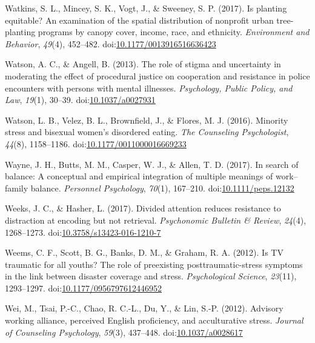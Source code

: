 \documentclass[english,man]{apa6}
\theoremstyle{definition}
\theoremstyle{definition}
\theoremstyle{definition}
\theoremstyle{remark}
\begin{document}
\hypertarget{ref-Watkins2017}{}
Watkins, S. L., Mincey, S. K., Vogt, J., \& Sweeney, S. P. (2017). Is
planting equitable? An examination of the spatial distribution of
nonprofit urban tree-planting programs by canopy cover, income, race,
and ethnicity. \emph{Environment and Behavior}, \emph{49}(4), 452--482.
doi:\href{https://doi.org/10.1177/0013916516636423}{10.1177/0013916516636423}

\hypertarget{ref-Watson2013}{}
Watson, A. C., \& Angell, B. (2013). The role of stigma and uncertainty
in moderating the effect of procedural justice on cooperation and
resistance in police encounters with persons with mental illnesses.
\emph{Psychology, Public Policy, and Law}, \emph{19}(1), 30--39.
doi:\href{https://doi.org/10.1037/a0027931}{10.1037/a0027931}

\hypertarget{ref-Watson2016}{}
Watson, L. B., Velez, B. L., Brownfield, J., \& Flores, M. J. (2016).
Minority stress and bisexual women's disordered eating. \emph{The
Counseling Psychologist}, \emph{44}(8), 1158--1186.
doi:\href{https://doi.org/10.1177/0011000016669233}{10.1177/0011000016669233}

\hypertarget{ref-Wayne2017}{}
Wayne, J. H., Butts, M. M., Casper, W. J., \& Allen, T. D. (2017). In
search of balance: A conceptual and empirical integration of multiple
meanings of work--family balance. \emph{Personnel Psychology},
\emph{70}(1), 167--210.
doi:\href{https://doi.org/10.1111/peps.12132}{10.1111/peps.12132}

\hypertarget{ref-Weeks2016}{}
Weeks, J. C., \& Hasher, L. (2017). Divided attention reduces resistance
to distraction at encoding but not retrieval. \emph{Psychonomic Bulletin
\& Review}, \emph{24}(4), 1268--1273.
doi:\href{https://doi.org/10.3758/s13423-016-1210-7}{10.3758/s13423-016-1210-7}

\hypertarget{ref-Weems2012}{}
Weems, C. F., Scott, B. G., Banks, D. M., \& Graham, R. A. (2012). Is TV
traumatic for all youths? The role of preexisting posttraumatic-stress
symptoms in the link between disaster coverage and stress.
\emph{Psychological Science}, \emph{23}(11), 1293--1297.
doi:\href{https://doi.org/10.1177/0956797612446952}{10.1177/0956797612446952}

\hypertarget{ref-Wei2012}{}
Wei, M., Tsai, P.-C., Chao, R. C.-L., Du, Y., \& Lin, S.-P. (2012).
Advisory working alliance, perceived English proficiency, and
acculturative stress. \emph{Journal of Counseling Psychology},
\emph{59}(3), 437--448.
doi:\href{https://doi.org/10.1037/a0028617}{10.1037/a0028617}
\end{document}
